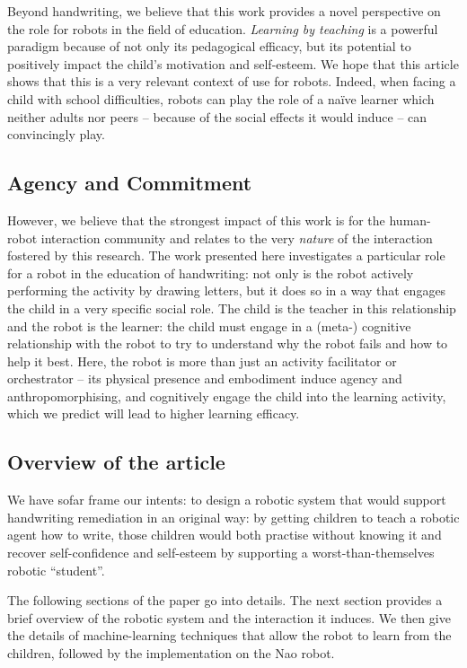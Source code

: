 \documentclass{article}
\begin{document}
Beyond handwriting, we believe that this work provides a novel perspective on
the role for robots in the field of education. \emph{Learning by teaching} is a
powerful paradigm because of not only its pedagogical efficacy, but its
potential to positively impact the child's motivation and self-esteem. We hope that 
this article shows that this is a very relevant context of use for robots. Indeed,
when facing a child with school difficulties, robots can play the role of a na\"ive 
learner which neither adults nor peers -- because of the social effects it would 
induce -- can convincingly play.

\subsection{Agency and Commitment}

However, we believe that the strongest impact of this work is for the
human-robot interaction community and relates to the very \emph{nature} of the
interaction fostered by this research. The work presented here investigates a
particular role for a robot in the education of handwriting: not only is the
robot actively performing the activity by drawing letters, but it does so in a
way that engages the child in a very specific social role. The child is the
teacher in this relationship and the robot is the learner: the child must engage
in a (meta-) cognitive relationship with the robot to try to understand why the
robot fails and how to help it best.  Here, the robot is more than just an
activity facilitator or orchestrator -- its physical presence and embodiment
induce agency and anthropomorphising, and cognitively engage the child into the
learning activity, which we predict will lead to higher learning efficacy.


\subsection*{Overview of the article}

We have sofar frame our intents: to design a robotic system that would support
handwriting remediation in an original way: by getting children to teach a
robotic agent how to write, those children would both practise without knowing
it and recover self-confidence and self-esteem by supporting a
worst-than-themselves robotic ``student''.

The following sections of the paper go into details. The next section provides a
brief overview of the robotic system and the interaction it induces. We then
give the details of machine-learning techniques that allow the robot to learn
from the children, followed by the implementation on the Nao robot.
\end{document}
